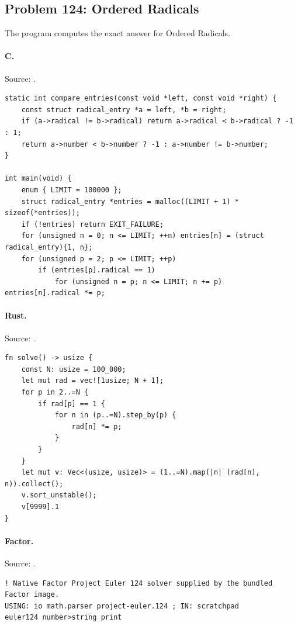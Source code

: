 \subsection{Problem 124: Ordered Radicals}
\label{walkthrough:p124}
The program computes the exact answer for Ordered Radicals.

\paragraph{C.} Source: .
\begin{lstlisting}
static int compare_entries(const void *left, const void *right) {
    const struct radical_entry *a = left, *b = right;
    if (a->radical != b->radical) return a->radical < b->radical ? -1 : 1;
    return a->number < b->number ? -1 : a->number != b->number;
}

int main(void) {
    enum { LIMIT = 100000 };
    struct radical_entry *entries = malloc((LIMIT + 1) * sizeof(*entries));
    if (!entries) return EXIT_FAILURE;
    for (unsigned n = 0; n <= LIMIT; ++n) entries[n] = (struct radical_entry){1, n};
    for (unsigned p = 2; p <= LIMIT; ++p)
        if (entries[p].radical == 1)
            for (unsigned n = p; n <= LIMIT; n += p) entries[n].radical *= p;
\end{lstlisting}

\paragraph{Rust.} Source: .
\begin{lstlisting}
fn solve() -> usize {
    const N: usize = 100_000;
    let mut rad = vec![1usize; N + 1];
    for p in 2..=N {
        if rad[p] == 1 {
            for n in (p..=N).step_by(p) {
                rad[n] *= p;
            }
        }
    }
    let mut v: Vec<(usize, usize)> = (1..=N).map(|n| (rad[n], n)).collect();
    v.sort_unstable();
    v[9999].1
}
\end{lstlisting}

\paragraph{Factor.} Source: .
\begin{lstlisting}
! Native Factor Project Euler 124 solver supplied by the bundled Factor image.
USING: io math.parser project-euler.124 ; IN: scratchpad
euler124 number>string print
\end{lstlisting}

